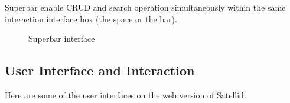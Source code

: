 Superbar enable \ac{CRUD} and search operation simultaneously within the same interaction interface box (the space or the bar).

\begin{figure}[htb]
    \centering
    \caption{Superbar interface}
    \label{fig:background:superbar}
\end{figure}

\subsection{User Interface and Interaction}

Here are some of the user interfaces on the web version of Satellid.
